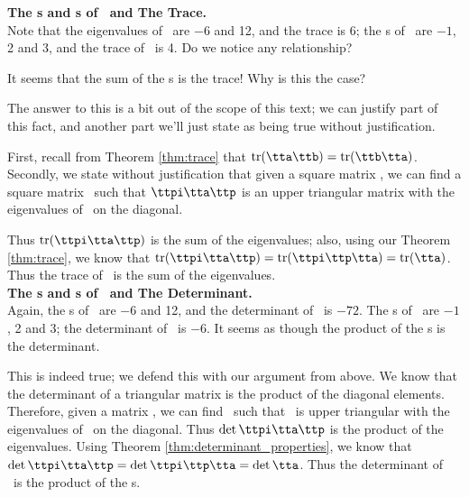 
\noindent \textsf{\textbf{The \el s and \ev s of \tta\ and The Trace.}}\\

Note that the eigenvalues of \tta\ are $-6$ and 12, and the trace is 6; the \el s of \ttb\ are $-1$, 2 and 3, and the trace of \ttb\ is 4. Do we notice any relationship? 

It seems that the sum of the \el s is the trace! Why is this the case?

The answer to this is a bit out of the scope of this text; we can justify part of this fact, and another part we'll just state as being true without justification. 

First, recall from Theorem \ref{thm:trace} that $\tr(\tta\ttb) = \tr(\ttb\tta)$. Secondly, we state without justification that given a square matrix \tta, we can find a square matrix \ttp\ such that $\ttpi\tta\ttp$ is an upper triangular matrix with the eigenvalues of \tta\ on the diagonal.


Thus $\tr(\ttpi\tta\ttp)$ is the sum of the eigenvalues; also, using our Theorem \ref{thm:trace}, we know that $\tr(\ttpi\tta\ttp) =  \tr(\ttpi\ttp\tta) =  \tr(\tta)$. Thus the trace of \tta\ is the sum of the eigenvalues.\\

\noindent \textsf{\textbf{The \el s and \ev s of \tta\ and The Determinant.}}\\

Again, the \el s of \tta\ are $-6$ and 12, and the determinant of \tta\ is 
$-72$. The \el s of \ttb\ are $-1$, 2 and 3; the determinant of \ttb\ is $-6$. It seems as though the product of the \el s is the determinant.

This is indeed true; we defend this with our argument from above. We know that the determinant of a triangular matrix is the product of the diagonal elements. Therefore, given a matrix \tta, we can find \ttp\ such that \ttpi\tta\ttp\ is upper triangular with the eigenvalues of \tta\ on the diagonal. Thus $\det{\ttpi\tta\ttp}$ is the product of the eigenvalues. Using Theorem \ref{thm:determinant_properties}, we know that $\det{\ttpi\tta\ttp} = \det{\ttpi\ttp\tta} = \det{\tta}$. Thus the determinant of \tta\ is the product of the \el s.

